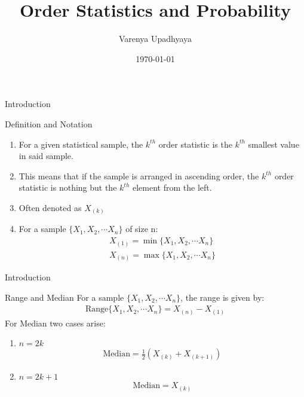 \documentclass{beamer}
\title{Order Statistics and Probability}
\author{Varenya Upadhyaya}
\institute{IITH}
\date{\today}
\begin{document}
%
\begin{frame}
\titlepage
\end{frame}
\begin{frame}{Introduction}
\begin{block}{Definition and Notation}
\begin{enumerate}[]
    \item For a given statistical sample, the $k^{th}$ order statistic is the $k^{th}$ smallest value in said sample.
    \item This means that if the sample is arranged in ascending order, the $k^{th}$ order statistic is nothing but the $k^{th}$ element from the left.
    \item Often denoted as $X_{(k)}$
    \item For a sample $\{X_1, X_2, \cdots X_n\}$ of size n:
    \begin{align}
        X_{(1)} = \min{\{X_1, X_2, \cdots X_n\}}\\
        X_{(n)} = \max{\{X_1, X_2, \cdots X_n\}}
    \end{align}
\end{enumerate}
 \end{block}
\end{frame}

\begin{frame}{Introduction}

    \begin{block}{Range and Median}
        For a sample $\{X_1, X_2, \cdots X_n\}$, the range is given by:
        \begin{align}
            \text{Range}\{X_1, X_2, \cdots X_n\} = X_{(n)}-X_{(1)}
        \end{align}
        For Median two cases arise:
        \begin{enumerate}
            \item $n=2k$
            \begin{align}
                \text{Median}=\frac{1}{2}(X_{(k)}+X_{(k+1)})
            \end{align}
            \item $n=2k+1$
            \begin{align}
                \text{Median} = X_{(k)}
            \end{align}
        \end{enumerate}
    
    \end{block}
\end{frame}
\end{document}

